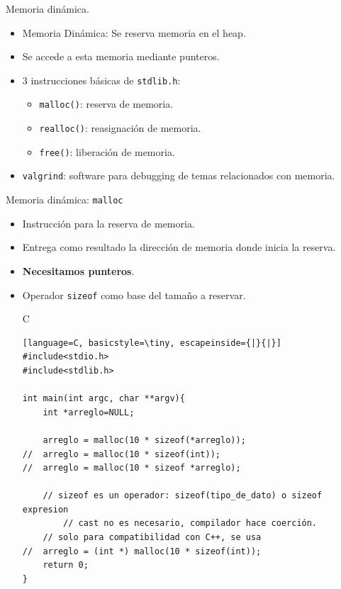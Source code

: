 \documentclass{beamer}
\begin{document}
\begin{frame}[fragile]{Memoria dinámica.}
\begin{itemize}
\item Memoria Dinámica: Se reserva memoria en el heap. 
\item Se accede a esta memoria mediante punteros.
\item 3 instrucciones básicas de \texttt{stdlib.h}:
\begin{itemize}
\item \texttt{malloc()}: reserva de memoria.
\item \texttt{realloc()}: reasignación de memoria.
\item \texttt{free()}: liberación de memoria.
\end{itemize}
\item \texttt{valgrind}: software para debugging de temas relacionados con memoria.
\end{itemize}
\end{frame}

\begin{frame}[fragile]{Memoria dinámica: \texttt{malloc}}
\begin{itemize}
\item Instrucción para la reserva de memoria.
\item Entrega como resultado la dirección de memoria donde inicia la reserva.
\item \textbf{Necesitamos punteros}.
\item Operador \texttt{sizeof} como base del tamaño a reservar. 
\begin{exampleblock}{C}
\begin{lstlisting}[language=C, basicstyle=\tiny, escapeinside={|}{|}]
#include<stdio.h>
#include<stdlib.h>

int main(int argc, char **argv){
	int *arreglo=NULL;

	arreglo = malloc(10 * sizeof(*arreglo));
//	arreglo = malloc(10 * sizeof(int));
//	arreglo = malloc(10 * sizeof *arreglo); 

	// sizeof es un operador: sizeof(tipo_de_dato) o sizeof expresion
        // cast no es necesario, compilador hace coerción.
	// solo para compatibilidad con C++, se usa
//	arreglo = (int *) malloc(10 * sizeof(int)); 
	return 0;
}
\end{lstlisting}
\end{exampleblock}
\end{itemize}
\end{frame}
\end{document}
